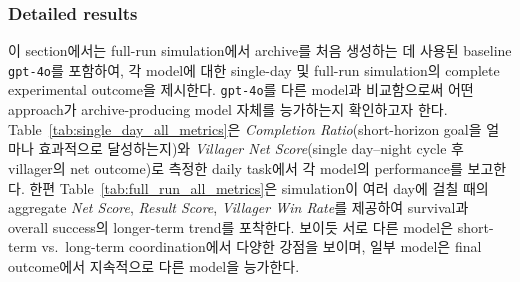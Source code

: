 \subsubsection{Detailed results}
이 section에서는 full-run simulation에서 archive를 처음 생성하는 데 사용된 baseline \texttt{gpt-4o}를 포함하여, 각 model에 대한 single-day 및 full-run simulation의 complete experimental outcome을 제시한다. \texttt{gpt-4o}를 다른 model과 비교함으로써 어떤 approach가 archive-producing model 자체를 능가하는지 확인하고자 한다. Table~\ref{tab:single_day_all_metrics}은 \emph{Completion Ratio}(short-horizon goal을 얼마나 효과적으로 달성하는지)와 \emph{Villager Net Score}(single day--night cycle 후 villager의 net outcome)로 측정한 daily task에서 각 model의 performance를 보고한다. 한편 Table~\ref{tab:full_run_all_metrics}은 simulation이 여러 day에 걸칠 때의 aggregate \emph{Net Score}, \emph{Result Score}, \emph{Villager Win Rate}를 제공하여 survival과 overall success의 longer-term trend를 포착한다. 보이듯 서로 다른 model은 short-term vs.\ long-term coordination에서 다양한 강점을 보이며, 일부 model은 final outcome에서 지속적으로 다른 model을 능가한다.
\begin{table}[htbp]
\centering
{}
\caption{각 model의 Single-Day Simulation metrics: completion ratio와 villager net score.}
\label{tab:single_day_all_metrics}
\end{table}

\begin{table}[htbp]
\centering
{}
\caption{각 model의 Full-Run Simulation metrics: net score, result score, villager win rate.}
\label{tab:full_run_all_metrics}
\end{table}

